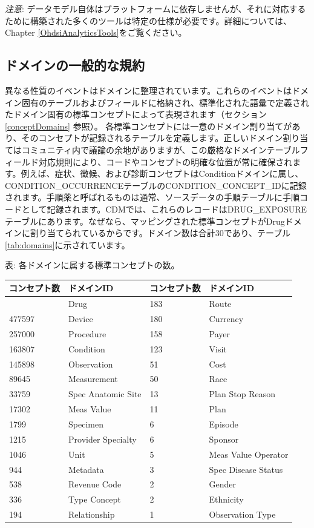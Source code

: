 \documentclass[
  11pt]{book}
\theoremstyle{definition}
\theoremstyle{definition}
\theoremstyle{definition}
\theoremstyle{definition}
\theoremstyle{remark}
\begin{document}
\emph{注意}: データモデル自体はプラットフォームに依存しませんが、それに対応するために構築された多くのツールは特定の仕様が必要です。詳細については、Chapter \ref{OhdsiAnalyticsTools}をご覧ください。

\subsection{ドメインの一般的な規約}\label{domains}

異なる性質のイベントはドメインに整理されています。これらのイベントはドメイン固有のテーブルおよびフィールドに格納され、標準化された語彙で定義されたドメイン固有の標準コンセプトによって表現されます（セクション \ref{conceptDomains} 参照）。 各標準コンセプトには一意のドメイン割り当てがあり、そのコンセプトが記録されるテーブルを定義します。正しいドメイン割り当てはコミュニティ内で議論の余地がありますが、この厳格なドメインテーブルフィールド対応規則により、コードやコンセプトの明確な位置が常に確保されます。例えば、症状、徴候、および診断コンセプトはConditionドメインに属し、CONDITION\_OCCURRENCEテーブルのCONDITION\_CONCEPT\_IDに記録されます。手順薬と呼ばれるものは通常、ソースデータの手順テーブルに手順コードとして記録されます。CDMでは、これらのレコードはDRUG\_EXPOSUREテーブルにあります。なぜなら、マッピングされた標準コンセプトがDrugドメインに割り当てられているからです。ドメイン数は合計30であり、テーブル\ref{tab:domains}に示されています。

表: \label{tab:domains} 各ドメインに属する標準コンセプトの数。

\begin{longtable}[]{@{}llll@{}}
\toprule\noalign{}
コンセプト数 & ドメインID & コンセプト数 & ドメインID \\
\midrule\noalign{}
\endhead
\bottomrule\noalign{}
\endlastfoot
1731378 & Drug & 183 & Route \\
477597 & Device & 180 & Currency \\
257000 & Procedure & 158 & Payer \\
163807 & Condition & 123 & Visit \\
145898 & Observation & 51 & Cost \\
89645 & Measurement & 50 & Race \\
33759 & Spec Anatomic Site & 13 & Plan Stop Reason \\
17302 & Meas Value & 11 & Plan \\
1799 & Specimen & 6 & Episode \\
1215 & Provider Specialty & 6 & Sponsor \\
1046 & Unit & 5 & Meas Value Operator \\
944 & Metadata & 3 & Spec Disease Status \\
538 & Revenue Code & 2 & Gender \\
336 & Type Concept & 2 & Ethnicity \\
194 & Relationship & 1 & Observation Type \\
\end{longtable}
\end{document}
